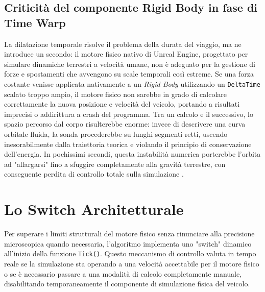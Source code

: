 
\subsection{Criticità del componente Rigid Body in fase di Time Warp}

La dilatazione temporale risolve il problema della durata del viaggio, ma ne introduce un secondo: il motore fisico nativo di Unreal Engine, progettato per simulare dinamiche terrestri a velocità umane, non è adeguato per la gestione di forze e spostamenti che avvengono su scale temporali così estreme.
Se una forza costante venisse applicata nativamente a un \textit{Rigid Body} utilizzando un \lstinline|DeltaTime| scalato troppo ampio, il motore fisico non sarebbe in grado di calcolare correttamente la nuova posizione e velocità del veicolo, portando a risultati imprecisi o addirittura a crash del programma.
Tra un calcolo e il successivo, lo spazio percorso dal corpo risulterebbe enorme: invece di descrivere una curva orbitale fluida, la sonda procederebbe su lunghi segmenti retti, uscendo inesorabilmente dalla traiettoria teorica e violando il principio di conservazione dell'energia. In pochissimi secondi, questa instabilità numerica porterebbe l'orbita ad "allargarsi" fino a sfuggire completamente alla gravità terrestre, con conseguente perdita di controllo totale sulla simulazione \cite{epicgames_unrealengine, simo2016realistic}.


\section{Lo Switch Architetturale}

Per superare i limiti strutturali del motore fisico senza rinunciare alla precisione microscopica quando necessaria, l'algoritmo implementa uno "switch" dinamico all'inizio della funzione \lstinline|Tick()|. Questo meccanismo di controllo valuta in tempo reale se la simulazione sta operando a una velocità accettabile per il motore fisico o se è necessario passare a una modalità di calcolo completamente manuale, disabilitando temporaneamente il componente di simulazione fisica del veicolo.

